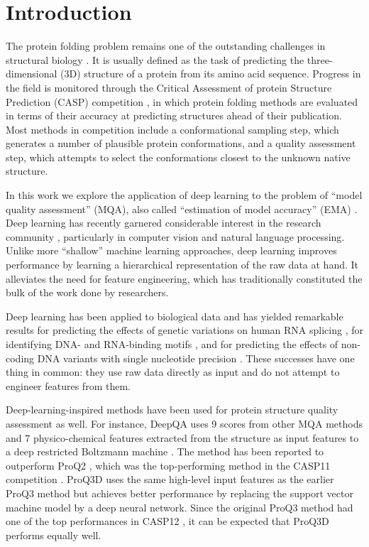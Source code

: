 \documentclass{bioinfo}
\begin{document}
\maketitle

\section{Introduction}

The protein folding problem remains one of the outstanding challenges
in structural biology \citep{dill2012folding}.  It is usually defined
as the task of predicting the three-dimensional (3D) structure of a
protein from its amino acid sequence.
Progress in the field is monitored through the Critical Assessment of
protein Structure Prediction (CASP) competition \citep{moult1995large},
in which protein folding methods are evaluated in terms of their
accuracy at predicting structures ahead of their
publication. Most methods in competition include a conformational
sampling step, which generates a number of plausible protein
conformations, and a quality assessment step, which attempts to select
the conformations closest to the unknown native structure.

In this work we explore the application of deep learning to the
problem of ``model quality assessment'' (MQA), also called
``estimation of model accuracy'' (EMA) \citep{kryshtafovych2015}. Deep
learning has recently garnered considerable interest in the
research community \citep{lecun2015deep}, particularly in computer
vision and natural language processing. Unlike more ``shallow''
machine learning approaches, deep learning improves performance by
learning a hierarchical representation of the raw data at hand. It
alleviates the need for feature engineering, which has traditionally
constituted the bulk of the work done by researchers.

Deep learning has been applied to biological data and has
yielded remarkable results for predicting the effects of genetic
variations on human RNA splicing \citep{xiong2015human}, for
identifying DNA- and RNA-binding
motifs \citep{alipanahi2015predicting}, and for predicting the effects
of non-coding DNA variants with single nucleotide
precision \citep{zhou2015predicting}. These successes have one thing in
common: they use raw data directly as input and do not attempt to
engineer features from them.

Deep-learning-inspired methods have been used for protein structure quality
assessment as well. For instance, DeepQA \citep{cao2016deepqa} uses 9
scores from other MQA methods and 7 physico-chemical features
extracted from the structure as input features to a deep restricted
Boltzmann machine \citep{hinton2006fast}. The method has been reported
to outperform ProQ2 \citep{ray2012proq2}, which was the top-performing
method in the CASP11 competition \citep{kryshtafovych2015}.  ProQ3D
\citep{uziela2017proq3d} uses the same high-level input features as
the earlier ProQ3 method \citep{uziela2016proq3} but achieves better
performance by replacing the support vector machine model by a deep
neural network. Since the original ProQ3 method had one of the top
performances in CASP12 \citep{elofsson2017qacasp12}, it can be
expected that ProQ3D performs equally well.
\end{document}

